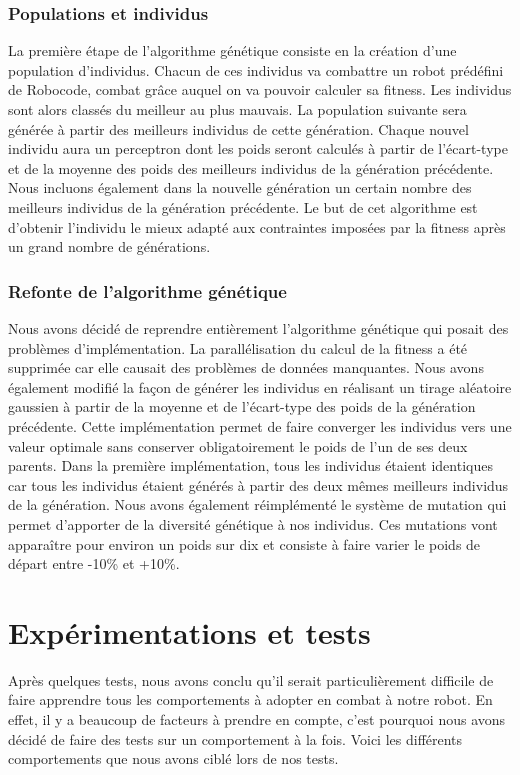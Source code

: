 \documentclass[a4paper,11pt]{article}
\begin{document}
\subsubsection{Populations et individus}
La première étape de l'algorithme génétique consiste en la création d'une population d'individus. Chacun de ces individus va combattre un robot prédéfini de Robocode, combat grâce auquel on va pouvoir calculer sa fitness. Les individus sont alors classés du meilleur au plus mauvais. La population suivante sera générée à partir des meilleurs individus de cette génération. Chaque nouvel individu aura un perceptron dont les poids seront calculés à partir de l'écart-type et de la moyenne des poids des meilleurs individus de la génération précédente. Nous incluons également dans la nouvelle génération un certain nombre des meilleurs individus de la génération précédente. Le but de cet algorithme est d'obtenir l'individu le mieux adapté aux contraintes imposées par la fitness après un grand nombre de générations.

\subsubsection{Refonte de l'algorithme génétique}
Nous avons décidé de reprendre entièrement l'algorithme génétique qui posait des problèmes d'implémentation. La parallélisation du calcul de la fitness a été supprimée car elle causait des problèmes de données manquantes. Nous avons également modifié la façon de générer les individus en réalisant un tirage aléatoire gaussien à partir de la moyenne et de l'écart-type des poids de la génération précédente. Cette implémentation permet de faire converger les individus vers une valeur optimale sans conserver obligatoirement le poids de l'un de ses deux parents. Dans la première implémentation, tous les individus étaient identiques car tous les individus étaient générés à partir des deux mêmes meilleurs individus de la génération. 
Nous avons également réimplémenté le système de mutation qui permet d'apporter de la diversité génétique à nos individus. Ces mutations vont apparaître pour environ un poids sur dix et consiste à faire varier le poids de départ entre -10\% et +10\%.


\section{Expérimentations et tests}
Après quelques tests, nous avons conclu qu'il serait particulièrement difficile de faire apprendre tous les comportements à adopter en combat à notre robot. En effet, il y a beaucoup de facteurs à prendre en compte, c'est pourquoi nous avons décidé de faire des tests sur un comportement à la fois. Voici les différents comportements que nous avons ciblé lors de nos tests.
\end{document}
